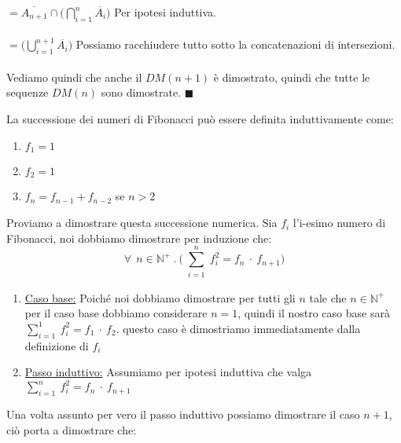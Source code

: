 \begin{example}[De Morgan]
\begin{enumerate}
        $= \overline{A_{n+1}} \cap \Big(\bigcap\limits_{i=1}^{n} \overline{A_i} \Big)$ \hspace{.5cm} Per ipotesi induttiva.\\\\
        $= \Big(\bigcup\limits_{i=1}^{n+1} \overline{A_i} \Big)$ \hspace{.5cm} Possiamo racchiudere tutto sotto la concatenazioni di intersezioni. \\ \\
        Vediamo quindi che anche il $DM(n+1)$ è dimostrato, quindi che tutte le sequenze $DM(n)$ sono dimostrate. \: \: $\blacksquare$
    \end{enumerate}
\end{example}
\begin{example}
    La successione dei numeri di Fibonacci può essere definita induttivamente come:
    \begin{enumerate}
        \item $f_1 = 1$
        \item $f_2 = 1$
        \item $f_n = f_{n-1} + f_{n-2}$ \hspace{.5cm} se $n > 2$
    \end{enumerate}
    \begin{demostration}
        Proviamo a dimostrare questa successione numerica. Sia $f_i$ l'i-esimo numero di Fibonacci, noi dobbiamo dimostrare per induzione che:
        \begin{equation}
            \forall \: \: n \in \mathbb{N}^{+}\:.\: \bigg(\sum_{\substack{i=1}}^n f_i^2 = f_n \: \cdot \:f_{n+1} \bigg)
        \end{equation}
        \begin{enumerate}
            \item \underline{Caso base:} Poiché noi dobbiamo dimostrare per tutti gli $n$ tale che $n \in \mathbb{N}^{+}$ per il caso base dobbiamo considerare $n = 1$, quindi il nostro caso base sarà $\sum_{i=1}^1\:f_i^{2} = f_1 \: \cdot \: f_{2}$. questo caso è dimostriamo immediatamente dalla definizione di $f_i$
            \item \underline{Passo induttivo:} Assumiamo per ipotesi induttiva che valga $\sum_{i=1}^n\:f_i^{2} = f_n \: \cdot \: f_{n+1}$
        \end{enumerate}
        Una volta assunto per vero il passo induttivo possiamo dimostrare il caso $n+1$, ciò porta a dimostrare che:\\ \\

\end{demostration}
\end{example}
